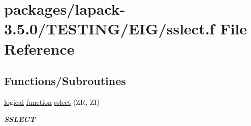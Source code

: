 \hypertarget{sslect_8f}{}\section{packages/lapack-\/3.5.0/\+T\+E\+S\+T\+I\+N\+G/\+E\+I\+G/sslect.f File Reference}
\label{sslect_8f}
\subsection*{Functions/\+Subroutines}
\begin{DoxyCompactItemize}
\item 
\hyperlink{tnc_8c_aa7b64cdf39500931f7b333343791a104}{logical} \hyperlink{afunc_8m_a7b5e596df91eadea6c537c0825e894a7}{function} \hyperlink{group__single__eig_ga9051201041524e344b189e8504011c6f}{sslect} (Z\+R, Z\+I)
\begin{DoxyCompactList}\small\item\em {\bfseries S\+S\+L\+E\+C\+T} \end{DoxyCompactList}\end{DoxyCompactItemize}
